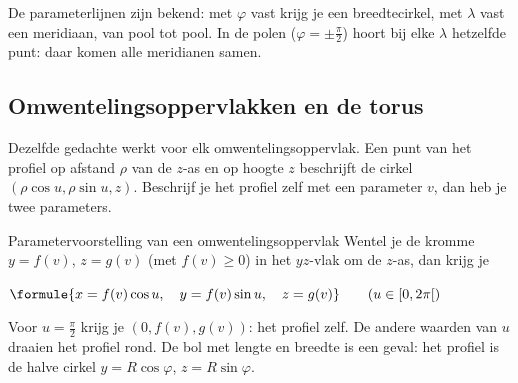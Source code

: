 De parameterlijnen zijn bekend: met $\varphi$ vast krijg je een breedtecirkel, met $\lambda$ vast een meridiaan, van pool tot pool. In de polen ($\varphi = \pm\tfrac\pi2$) hoort bij elke $\lambda$ hetzelfde punt: daar komen alle meridianen samen.


\begin{oefeningen}
\end{oefeningen}

\subsection{Omwentelingsoppervlakken en de torus}

Dezelfde gedachte werkt voor elk omwentelingsoppervlak. Een punt van het profiel op afstand $\rho$ van de $z$-as en op hoogte $z$ beschrijft de cirkel $(\rho\cos u, \rho\sin u, z)$. Beschrijf je het profiel zelf met een parameter $v$, dan heb je twee parameters.

\begin{theorie}
\begin{stelling}{Parametervoorstelling van een omwentelingsoppervlak}
Wentel je de kromme $y = f(v)$, $z = g(v)$ (met $f(v) \geqslant 0$) in het $yz$-vlak om de $z$-as, dan krijg je

\vspace{1mm}
\qquad $\formule{x = f(v)\cos u, \quad y = f(v)\sin u, \quad z = g(v)} \qquad (u \in [0, 2\pi[)$
\end{stelling}
\end{theorie}

Voor $u = \tfrac\pi2$ krijg je $(0, f(v), g(v))$: het profiel zelf. De andere waarden van $u$ draaien het profiel rond. De bol met lengte en breedte is een geval: het profiel is de halve cirkel $y = R\cos\varphi$, $z = R\sin\varphi$.

